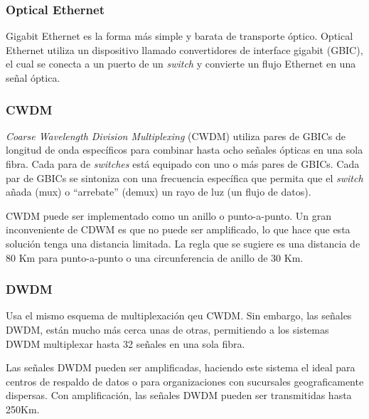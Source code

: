 \documentclass[10pt,journal,compsoc]{IEEEtran}
\begin{document}
\subsubsection{Optical Ethernet}
Gigabit Ethernet es la forma más simple y barata de transporte óptico. Optical Ethernet utiliza un dispositivo llamado convertidores de interface gigabit (GBIC), el cual se conecta a un puerto de un \emph{switch} y convierte un flujo Ethernet en una señal óptica.

\subsubsection{CWDM}
\emph{Coarse Wavelength Division Multiplexing} (CWDM) utiliza pares de GBICs de longitud de onda específicos para combinar hasta ocho señales ópticas en una sola fibra. Cada para de \emph{switches} está equipado con uno o más pares de GBICs. Cada par de GBICs se sintoniza con una frecuencia específica que permita que el \emph{switch} añada (mux) o ``arrebate'' (demux) un rayo de luz (un flujo de datos).

CWDM puede ser implementado como un anillo o punto-a-punto. Un gran inconveniente de CDWM es que no puede ser amplificado, lo que hace que esta solución tenga una distancia limitada. La regla que se sugiere es una distancia de 80 Km para punto-a-punto o una circunferencia de anillo de 30 Km.

\subsubsection{DWDM}
Usa el mismo esquema de multiplexación qeu CWDM. Sin embargo, las señales DWDM, están mucho más cerca unas de otras, permitiendo a los sistemas DWDM multiplexar hasta 32 señales en una sola fibra. 

Las señales DWDM pueden ser amplificadas, haciendo este sistema el ideal para centros de respaldo de datos o para organizaciones con sucursales geograficamente dispersas. Con amplificación, las señales DWDM pueden ser transmitidas hasta 250Km.

\end{document}
